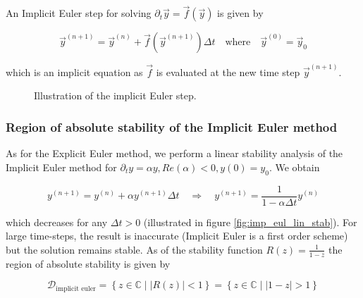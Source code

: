An Implicit Euler step for solving $\partial_t \vec{y} = \vec{f} \left(\vec{y} \right)$ is given by

\[
    \vec{y}^{(n+1)} = \vec{y}^{(n)} + \vec{f} \left( \vec{y}^{(n + 1)} \right) \Delta t \quad\mathrm{where}\quad   \vec{y}^{(0)} = \vec{y}_0
\]

which is an implicit equation as $\vec{f}$ is evaluated at the new time step $\vec{y}^{(n+1)}$.


\begin{figure}[!htb]
  \centering
  \hfill
  \caption{Illustration of the implicit Euler step.}
  \label{fig:implicit_euler_intuition}
\end{figure}



\subsubsection{Region of absolute stability of the Implicit Euler method}

As for the Explicit Euler method, we perform a linear stability analysis of the Implicit Euler method for $\partial_t y = \alpha y, Re(\alpha) < 0, y(0) = y_0$. We obtain

\[
  y^{(n+1)} = y^{(n)} + \alpha y^{(n+1)} \Delta t \quad \Rightarrow \quad y^{(n+1)} = \frac{1}{1 - \alpha \Delta t} y^{(n)}
\]

which decreases for any $\Delta t > 0$ (illustrated in figure \ref{fig:imp_eul_lin_stab}). For large time-steps, the result is inaccurate (Implicit Euler is a first order scheme) but the solution remains stable. As of the stability function $R(z) = \frac{1}{1 - z}$ the region of absolute stability is given by

\[ 
  \mathcal{D}_{\text{implicit euler}} = \left\{ z \in \mathbb{C} \mid \left| R(z) \right| < 1 \right\} = \left\{ z \in \mathbb{C} \mid \left| 1 - z \right| > 1 \right\}
\]

